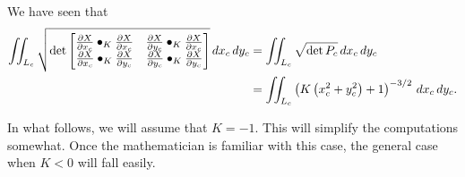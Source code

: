 \documentclass[newpage,hints,handout]{ximera}
\begin{document}
We have seen that
\begin{align*}
  \iint_{L_c} \sqrt{
  \det
  \begin{bmatrix}
    \pp[X]{x_c}\bullet_K \pp[X]{x_c} & \pp[X]{y_c}\bullet_K \pp[X]{x_c} \\
    \pp[X]{x_c}\bullet_K \pp[X]{y_c} & \pp[X]{y_c}\bullet_K \pp[X]{y_c}
  \end{bmatrix}
  }\d x_c\d y_c &=
  \iint_{L_c} \sqrt{\det P_c}\d x_c\d y_c\\
  &=\iint_{L_c} \left(K\left(x_c^2+y_c^2\right)+1\right)^{-3/2} \d x_c\d y_c.
\end{align*}


In what follows, we will assume that $K=-1$. This will simplify the
computations somewhat. Once the mathematician is familiar with this
case, the general case when $K<0$ will fall easily.
\end{document}
